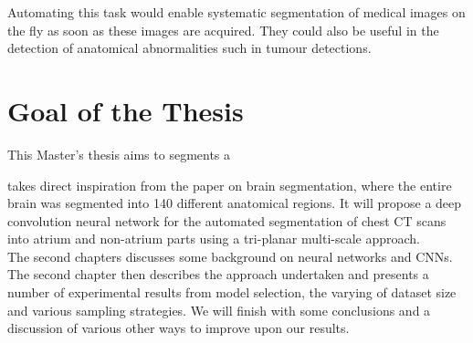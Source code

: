Automating this task would enable systematic segmentation of medical images on the fly as soon as these images are acquired. They could also be useful in the detection of anatomical abnormalities such in tumour detections.\\

\section{Goal of the Thesis}

This Master's thesis aims to segments a 

takes direct inspiration from the paper on brain segmentation, where the entire brain was segmented into 140 different anatomical regions. It will propose a deep convolution neural network for the automated segmentation of chest CT scans into atrium and non-atrium parts using a tri-planar multi-scale approach. \\

The second chapters discusses some background on neural networks and CNNs. The second chapter then describes the approach undertaken and presents a number of experimental results from model selection, the varying of dataset size and various sampling strategies. We will finish with some conclusions and a discussion of various other ways to improve upon our results.










